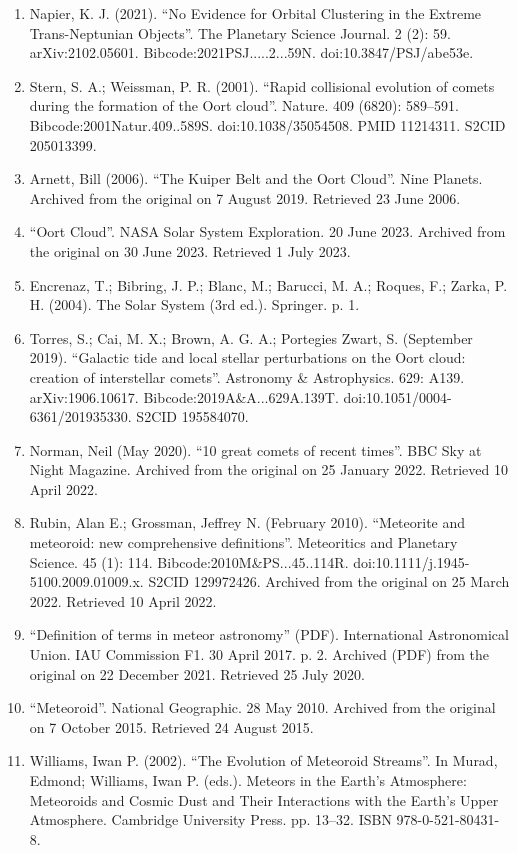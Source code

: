 \begin{enumerate}
\item Napier, K. J. (2021). ``No Evidence for Orbital Clustering in the Extreme Trans-Neptunian Objects''. The Planetary Science Journal. 2 (2): 59. arXiv:2102.05601. Bibcode:2021PSJ.....2...59N. doi:10.3847/PSJ/abe53e.
\item Stern, S. A.; Weissman, P. R. (2001). ``Rapid collisional evolution of comets during the formation of the Oort cloud''. Nature. 409 (6820): 589–591. Bibcode:2001Natur.409..589S. doi:10.1038/35054508. PMID 11214311. S2CID 205013399.
\item Arnett, Bill (2006). ``The Kuiper Belt and the Oort Cloud''. Nine Planets. Archived from the original on 7 August 2019. Retrieved 23 June 2006.
\item ``Oort Cloud''. NASA Solar System Exploration. 20 June 2023. Archived from the original on 30 June 2023. Retrieved 1 July 2023.
\item Encrenaz, T.; Bibring, J. P.; Blanc, M.; Barucci, M. A.; Roques, F.; Zarka, P. H. (2004). The Solar System (3rd ed.). Springer. p. 1.
\item Torres, S.; Cai, M. X.; Brown, A. G. A.; Portegies Zwart, S. (September 2019). ``Galactic tide and local stellar perturbations on the Oort cloud: creation of interstellar comets''. Astronomy \& Astrophysics. 629: A139. arXiv:1906.10617. Bibcode:2019A\&A...629A.139T. doi:10.1051/0004-6361/201935330. S2CID 195584070.
\item Norman, Neil (May 2020). ``10 great comets of recent times''. BBC Sky at Night Magazine. Archived from the original on 25 January 2022. Retrieved 10 April 2022.
\item Rubin, Alan E.; Grossman, Jeffrey N. (February 2010). ``Meteorite and meteoroid: new comprehensive definitions''. Meteoritics and Planetary Science. 45 (1): 114. Bibcode:2010M\&PS...45..114R. doi:10.1111/j.1945-5100.2009.01009.x. S2CID 129972426. Archived from the original on 25 March 2022. Retrieved 10 April 2022.
\item ``Definition of terms in meteor astronomy'' (PDF). International Astronomical Union. IAU Commission F1. 30 April 2017. p. 2. Archived (PDF) from the original on 22 December 2021. Retrieved 25 July 2020.
\item ``Meteoroid''. National Geographic. 28 May 2010. Archived from the original on 7 October 2015. Retrieved 24 August 2015.
\item Williams, Iwan P. (2002). ``The Evolution of Meteoroid Streams''. In Murad, Edmond; Williams, Iwan P. (eds.). Meteors in the Earth's Atmosphere: Meteoroids and Cosmic Dust and Their Interactions with the Earth's Upper Atmosphere. Cambridge University Press. pp. 13–32. ISBN 978-0-521-80431-8.

\end{enumerate}

